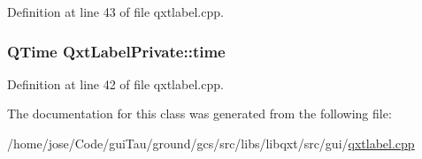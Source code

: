 Definition at line 43 of file qxtlabel.\-cpp.

\hypertarget{class_qxt_label_private_ad849e9287e86c639603dc2b90118a1d4}{
\subsubsection[{time}]{\setlength{\rightskip}{0pt plus 5cm}Q\-Time Qxt\-Label\-Private\-::time}}\label{class_qxt_label_private_ad849e9287e86c639603dc2b90118a1d4}


Definition at line 42 of file qxtlabel.\-cpp.



The documentation for this class was generated from the following file\-:\begin{DoxyCompactItemize}
\item 
/home/jose/\-Code/gui\-Tau/ground/gcs/src/libs/libqxt/src/gui/\hyperlink{qxtlabel_8cpp}{qxtlabel.\-cpp}\end{DoxyCompactItemize}
